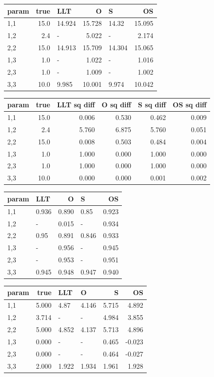 \documentclass[
]{article}
\begin{document}
\begin{longtable}[t]{l|r|l|r|l|r}
\hline
param & true & LLT & O & S & OS\\
\hline
1,1 & 15.0 & 14.924 & 15.728 & 14.32 & 15.095\\
\hline
1,2 & 2.4 & - & 5.022 & - & 2.174\\
\hline
2,2 & 15.0 & 14.913 & 15.709 & 14.304 & 15.065\\
\hline
1,3 & 1.0 & - & 1.022 & - & 1.016\\
\hline
2,3 & 1.0 & - & 1.009 & - & 1.002\\
\hline
3,3 & 10.0 & 9.985 & 10.001 & 9.974 & 10.042\\
\hline
\end{longtable}

\begin{longtable}[t]{l|r|r|r|r|r}
\hline
param & true & LLT sq diff & O sq diff & S sq diff & OS sq diff\\
\hline
1,1 & 15.0 & 0.006 & 0.530 & 0.462 & 0.009\\
\hline
1,2 & 2.4 & 5.760 & 6.875 & 5.760 & 0.051\\
\hline
2,2 & 15.0 & 0.008 & 0.503 & 0.484 & 0.004\\
\hline
1,3 & 1.0 & 1.000 & 0.000 & 1.000 & 0.000\\
\hline
2,3 & 1.0 & 1.000 & 0.000 & 1.000 & 0.000\\
\hline
3,3 & 10.0 & 0.000 & 0.000 & 0.001 & 0.002\\
\hline
\end{longtable}

\begin{longtable}[t]{l|l|r|l|r}
\hline
param & LLT & O & S & OS\\
\hline
1,1 & 0.936 & 0.890 & 0.85 & 0.923\\
\hline
1,2 & - & 0.015 & - & 0.934\\
\hline
2,2 & 0.95 & 0.891 & 0.846 & 0.933\\
\hline
1,3 & - & 0.956 & - & 0.945\\
\hline
2,3 & - & 0.953 & - & 0.951\\
\hline
3,3 & 0.945 & 0.948 & 0.947 & 0.940\\
\hline
\end{longtable}

\begin{longtable}[t]{l|r|l|l|r|r}
\hline
param & true & LLT & O & S & OS\\
\hline
1,1 & 5.000 & 4.87 & 4.146 & 5.715 & 4.892\\
\hline
1,2 & 3.714 & - & - & 4.984 & 3.855\\
\hline
2,2 & 5.000 & 4.852 & 4.137 & 5.713 & 4.896\\
\hline
1,3 & 0.000 & - & - & 0.465 & -0.023\\
\hline
2,3 & 0.000 & - & - & 0.464 & -0.027\\
\hline
3,3 & 2.000 & 1.922 & 1.934 & 1.961 & 1.928\\
\hline
\end{longtable}
\end{document}
